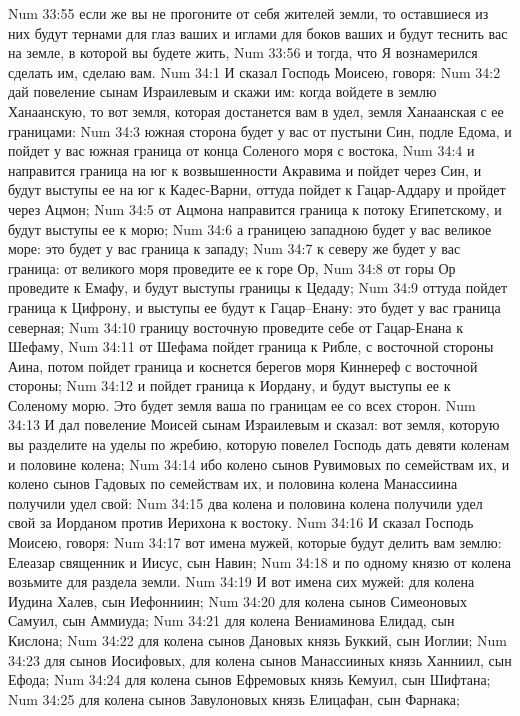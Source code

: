 Num 33:55  если же вы не прогоните от себя жителей земли, то оставшиеся из них будут тернами для глаз ваших и иглами для боков ваших и будут теснить вас на земле, в которой вы будете жить,
Num 33:56  и тогда, что Я вознамерился сделать им, сделаю вам.
Num 34:1  И сказал Господь Моисею, говоря:
Num 34:2  дай повеление сынам Израилевым и скажи им: когда войдете в землю Ханаанскую, то вот земля, которая достанется вам в удел, земля Ханаанская с ее границами:
Num 34:3  южная сторона будет у вас от пустыни Син, подле Едома, и пойдет у вас южная граница от конца Соленого моря с востока,
Num 34:4  и направится граница на юг к возвышенности Акравима и пойдет через Син, и будут выступы ее на юг к Кадес-Варни, оттуда пойдет к Гацар-Аддару и пройдет через Ацмон;
Num 34:5  от Ацмона направится граница к потоку Египетскому, и будут выступы ее к морю;
Num 34:6  а границею западною будет у вас великое море: это будет у вас граница к западу;
Num 34:7  к северу же будет у вас граница: от великого моря проведите ее к горе Ор,
Num 34:8  от горы Ор проведите к Емафу, и будут выступы границы к Цедаду;
Num 34:9  оттуда пойдет граница к Цифрону, и выступы ее будут к Гацар--Енану: это будет у вас граница северная;
Num 34:10  границу восточную проведите себе от Гацар-Енана к Шефаму,
Num 34:11  от Шефама пойдет граница к Рибле, с восточной стороны Аина, потом пойдет граница и коснется берегов моря Киннереф с восточной стороны;
Num 34:12  и пойдет граница к Иордану, и будут выступы ее к Соленому морю. Это будет земля ваша по границам ее со всех сторон.
Num 34:13  И дал повеление Моисей сынам Израилевым и сказал: вот земля, которую вы разделите на уделы по жребию, которую повелел Господь дать девяти коленам и половине колена;
Num 34:14  ибо колено сынов Рувимовых по семействам их, и колено сынов Гадовых по семействам их, и половина колена Манассиина получили удел свой:
Num 34:15  два колена и половина колена получили удел свой за Иорданом против Иерихона к востоку.
Num 34:16  И сказал Господь Моисею, говоря:
Num 34:17  вот имена мужей, которые будут делить вам землю: Елеазар священник и Иисус, сын Навин;
Num 34:18  и по одному князю от колена возьмите для раздела земли.
Num 34:19  И вот имена сих мужей: для колена Иудина Халев, сын Иефонниин;
Num 34:20  для колена сынов Симеоновых Самуил, сын Аммиуда;
Num 34:21  для колена Вениаминова Елидад, сын Кислона;
Num 34:22  для колена сынов Дановых князь Буккий, сын Иоглии;
Num 34:23  для сынов Иосифовых, для колена сынов Манассииных князь Ханниил, сын Ефода;
Num 34:24  для колена сынов Ефремовых князь Кемуил, сын Шифтана;
Num 34:25  для колена сынов Завулоновых князь Елицафан, сын Фарнака;
